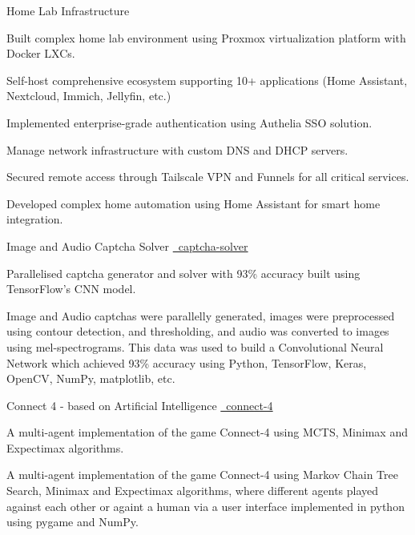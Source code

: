 \begin{cventries}
   \cvproject
     {Home Lab Infrastructure}
     {{}}
     {}
     {
        \begin{cvitems}
        \vspace{-0.5ex}
        \item {Built complex home lab environment using Proxmox virtualization platform with Docker LXCs.}
        \item {Self-host comprehensive ecosystem supporting 10+ applications (Home Assistant, Nextcloud, Immich, Jellyfin, etc.)}
        \item {Implemented enterprise-grade authentication using Authelia SSO solution.}
        \item {Manage network infrastructure with custom DNS and DHCP servers.}
        \item {Secured remote access through Tailscale VPN and Funnels for all critical services.}
        \item {Developed complex home automation using Home Assistant for smart home integration.}
        \end{cvitems}
     }
     
   \cvproject
    {Image and Audio Captcha Solver}
    {
    {}
    {\href{https://github.com/mukeshmk/image-audio-captcha}
    {\faGithubSquare\ captcha-solver}}
    }
    {}
    {
      \begin{cvitems}
      \vspace{-0.5ex}
        {
        \item {Parallelised captcha generator and solver with 93\% accuracy built using TensorFlow’s CNN model.}
        }
        {
        Image and Audio captchas were parallelly generated, images were preprocessed using contour detection, and thresholding, and audio was converted to images using mel-spectrograms. This data was used to build a Convolutional Neural Network which achieved 93\% accuracy using Python, TensorFlow, Keras, OpenCV, NumPy, matplotlib, etc.
        }
      \end{cvitems}
    }
  \cvproject
    {Connect 4 - based on Artificial Intelligence}
    {
    {}
    {\href{https://github.com/mukeshmk/connect-4}{\faGithubSquare\ connect-4}}
    }
    {}
    {
      \begin{cvitems}
      \vspace{-0.5ex}
      {
      \item {A multi-agent implementation of the game Connect-4 using MCTS, Minimax and Expectimax algorithms.} 
      }
      {
      A multi-agent implementation of the game Connect-4 using Markov Chain Tree Search, Minimax and Expectimax algorithms, where different agents played against each other or againt a human via a user interface implemented in python using pygame and NumPy.
      }
      \end{cvitems}
    }
\end{cventries}

